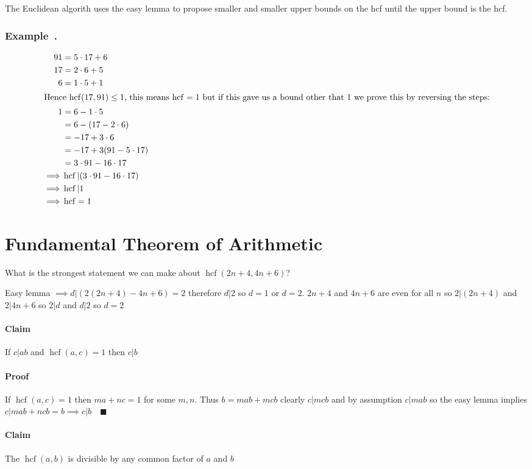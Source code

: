\documentclass{article}
\newcommand{\hcf}{\operatorname{hcf}}
\newcounter{example}[section]
\newenvironment{example}[1][]{\refstepcounter{example}\vspace{-0.2cm}
\subsubsection*{Example~\thesection.\theexample} \rmfamily}{\par}
\begin{document}
The Euclidean algorith uses the easy lemma to propose smaller and smaller upper bounds on the hcf until the upper bound is the hcf.

\begin{example}
\begin{align*}
91 &= 5\cdot17+6\\
17 &= 2\cdot 6+5\\
6 &= 1\cdot 5+1\\
\intertext{Hence \(\hcf(17,91) \le 1\), this means \(\hcf=1\) but if this gave us a bound other that 1 we prove this by reversing the steps:}
1 &= 6-1\cdot 5\\
&= 6-(17-2\cdot6)\\
&=-17+3\cdot 6\\
&=-17+3(91-5\cdot17)\\
&= 3\cdot 91-16\cdot17\\
\implies &\hcf|(3\cdot91-16\cdot17)\\
\implies &\hcf|1\\
\implies &\hcf = 1
\end{align*}
\end{example}
\section{Fundamental Theorem of Arithmetic}

What is the strongest statement we can make about \(\hcf(2n+4,4n+6)\)?

Easy lemma \(\implies d|(2(2n+4)-4n+6)=2\) therefore \(d|2\) so \(d=1\) or \(d=2\). \(2n+4\) and \(4n+6\) are even for all \(n\) so \(2|(2n+4)\) and \(2|4n+6\) so \(2|d\) and \(d|2\) so \(d=2\)

\paragraph{Claim} If \(c|ab\) and \(\hcf(a,c)=1\) then \(c|b\)

\paragraph{Proof} If \(\hcf(a,c)=1\) then \(ma+nc=1\) for some \(m,n\). Thus \(b=mab+mcb \) clearly \(c|mcb\) and by assumption \(c|mab\) so the easy lemma implies \(c|mab+ncb=b\implies c|b\quad\blacksquare\)

\paragraph{Claim} The \(\hcf(a,b)\) is divisible by any common factor of \(a\) and \(b\)
\end{document}
